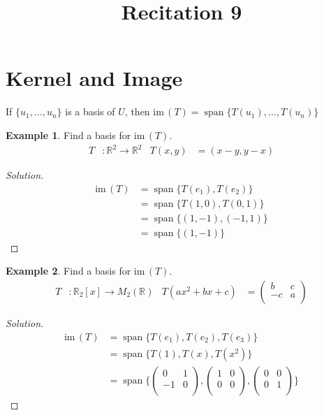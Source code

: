 \documentclass[fleqn, a4paper, 12pt]{article}
\title{Recitation 9}
\author{}
\date{\formatdate{24}{12}{2014}}
\newcommand{\im}{\mathrm{im}\,}
\theoremstyle{definition}
\newtheorem{example}{Example}
\theoremstyle{theorem}
\newenvironment{solution}
{\begin{proof}[Solution]\let\qed\relax}
	{\end{proof}}
\DeclareMathOperator{\vspan}{\mathrm{span}} %
\begin{document}
\maketitle

\tableofcontents

\newpage
\section{Kernel and Image}

If $\{u_1, \dots, u_n\}$ is a basis of $U$, then $\im (T) = \vspan\{T(u_1), \dots, T(u_n)\} $

\begin{example}
	Find a basis for $\im (T)$.
	\begin{align*}
		T &: \mathbb{R}^2 \to \mathbb{R}^2 & T(x, y) &= (x-y, y-x)
	\end{align*}
\end{example}

\begin{solution}
	\begin{align*}
		\im (T) &= \vspan \{T(e_1), T(e_2)\}\\
		&= \vspan\{T(1,0), T(0,1)\}\\
		&= \vspan\{(1, -1), (-1, 1)\}\\
		&= \vspan\{(1, -1)\}
	\end{align*}
\end{solution}

\begin{example}
	Find a basis for $\im (T)$.
	\begin{align*}
	T &: \mathbb{R}_2 [x] \to M_2 (\mathbb{R}) & T(ax^2 + bx + c) &= 
		\begin{pmatrix}
			b & c\\
			-c & a\\
		\end{pmatrix}
	\end{align*}
\end{example}

\begin{solution}
	\begin{align*}
		\im (T) &= \vspan \{T(e_1), T(e_2), T(e_3)\}\\
		&= \vspan\{T(1), T(x), T(x^2)\}\\
		&= \vspan
			\{
				\begin{pmatrix}
					0 & 1\\
					-1 & 0\\
				\end{pmatrix}
				,
				\begin{pmatrix}
					1 & 0\\
					0 & 0\\
				\end{pmatrix}
				,
				\begin{pmatrix}
					0 & 0\\
					0 & 1\\
				\end{pmatrix}
			\}
	\end{align*}
\end{solution}
\end{document}
